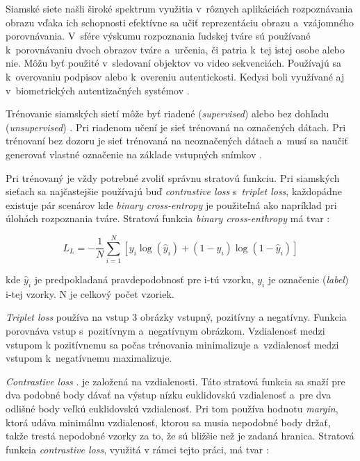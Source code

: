 Siamské siete našli široké spektrum využitia v~rôznych aplikáciách rozpoznávania obrazu vďaka ich schopnosti efektívne sa učiť reprezentáciu obrazu a~vzájomného porovnávania. V~sfére výskumu rozpoznania ľudskej tváre sú používané k~porovnávaniu dvoch obrazov tváre a~určenia, či patria k~tej istej osobe alebo nie. Môžu byť použité v~sledovaní objektov vo video sekvenciách. Používajú sa k~overovaniu podpisov alebo k~overeniu autentickosti. Kedysi boli využívané aj v~biometrických autentizačných systémov \cite{siam_doplnok}.

Trénovanie siamských sietí môže byť riadené (\textit{supervised}) alebo bez dohľadu (\textit{unsupervised}) \cite{siam_doplnok}. Pri riadenom učení je sieť trénovaná na označených dátach. Pri trénovaní bez dozoru je sieť trénovaná na neoznačených dátach a~musí sa naučiť generovať vlastné označenie na základe vstupných snímkov \cite{siam_doplnok}.

Pri trénovaný je vždy potrebné zvoliť správnu stratovú funkciu. Pri siamských sieťach sa najčastejšie používajú buď \textit{contrastive loss} s~\textit{triplet loss}, každopádne existuje pár scenárov kde \textit{binary cross-entropy} je použiteľná ako napríklad pri úlohách rozpoznania tváre. Stratová funkcia \textit{binary cross-enthropy} má tvar \cite{cross_entro_loss}:

\begin{equation}
L_L = -\frac{1}{N} \sum_{i=1}^{N} \left[ y_i \log(\hat{y}_i) + (1 - y_i) \log(1 - \hat{y}_i) \right]
\end{equation}

kde $\hat{y}_i$ je predpokladaná pravdepodobnosť pre i-tú vzorku, $y_i$ je označenie (\textit{label}) i-tej vzorky. N je celkový počet vzoriek.

\textit{Triplet loss} \cite{losses} používa na vstup 3 obrázky vstupný, pozitívny a negatívny. Funkcia porovnáva vstup s~pozitívnym a~negatívnym obrázkom. Vzdialenosť medzi vstupom k pozitívnemu sa počas trénovania minimalizuje a~vzdialenosť medzi vstupom k~negatívnemu maximalizuje. 

\textit{Contrastive loss} \cite{losses}. je založená na vzdialenosti. Táto stratová funkcia sa snaží pre dva podobné body dávať na výstup nízku euklidovskú vzdialenosť a~pre dva odlišné body veľkú euklidovskú vzdialenosť. Pri tom používa hodnotu \textit{margin}, ktorá udáva minimálnu vzdialenosť, ktorou sa musia nepodobné body držať, takže trestá nepodobné vzorky za to, že sú bližšie než je zadaná hranica. Stratová funkcia \textit{contrastive loss}, využitá v rámci tejto práci, má tvar \cite{7899663}:

